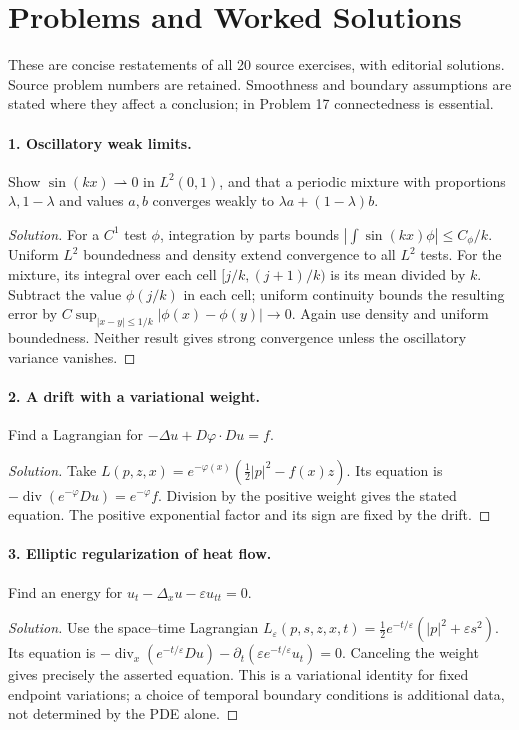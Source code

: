 \Needspace{55mm}
\section{Problems and Worked Solutions}
\label{sec:8-7}
These are concise restatements of all 20 source exercises, with editorial
solutions. Source problem numbers are retained. Smoothness and boundary
assumptions are stated where they affect a conclusion; in Problem 17
connectedness is essential.

\Needspace{30mm}
\paragraph{1. Oscillatory weak limits.}
Show $\sin(kx)\rightharpoonup0$ in $L^2(0,1)$, and that a periodic
mixture with proportions $\lambda,1-\lambda$ and values $a,b$ converges
weakly to $\lambda a+(1-\lambda)b$.
\begin{proof}[Solution]
For a $C^1$ test $\phi$, integration by parts bounds
$|\int\sin(kx)\phi|\leq C_\phi/k$. Uniform $L^2$ boundedness and density
extend convergence to all $L^2$ tests.
For the mixture, its integral over each cell $[j/k,(j+1)/k)$ is its mean
divided by $k$. Subtract the value $\phi(j/k)$ in each cell; uniform
continuity bounds the resulting error by
$C\sup_{|x-y|\leq1/k}|\phi(x)-\phi(y)|\to0$.
Again use density and uniform boundedness.
Neither result gives strong convergence unless the oscillatory variance vanishes.
\end{proof}

\Needspace{30mm}
\paragraph{2. A drift with a variational weight.}
Find a Lagrangian for $-\Delta u+D\varphi\cdot Du=f$.
\begin{proof}[Solution]
Take $L(p,z,x)=e^{-\varphi(x)}(\frac12|p|^2-f(x)z)$.
Its equation is $-\operatorname{div}(e^{-\varphi}Du)=e^{-\varphi}f$.
Division by the positive weight gives the stated equation.
The positive exponential factor and its sign are fixed by the drift.
\end{proof}

\Needspace{30mm}
\paragraph{3. Elliptic regularization of heat flow.}
Find an energy for $u_t-\Delta_xu-\varepsilon u_{tt}=0$.
\begin{proof}[Solution]
Use the space--time Lagrangian
$L_\varepsilon(p,s,z,x,t)=\frac12e^{-t/\varepsilon}(|p|^2+\varepsilon s^2)$.
Its equation is
$-\operatorname{div}_x(e^{-t/\varepsilon}Du)
-\partial_t(\varepsilon e^{-t/\varepsilon}u_t)=0$.
Canceling the weight gives precisely the asserted equation.
This is a variational identity for fixed endpoint variations; a choice of
temporal boundary conditions is additional data, not determined by the PDE alone.
\end{proof}

